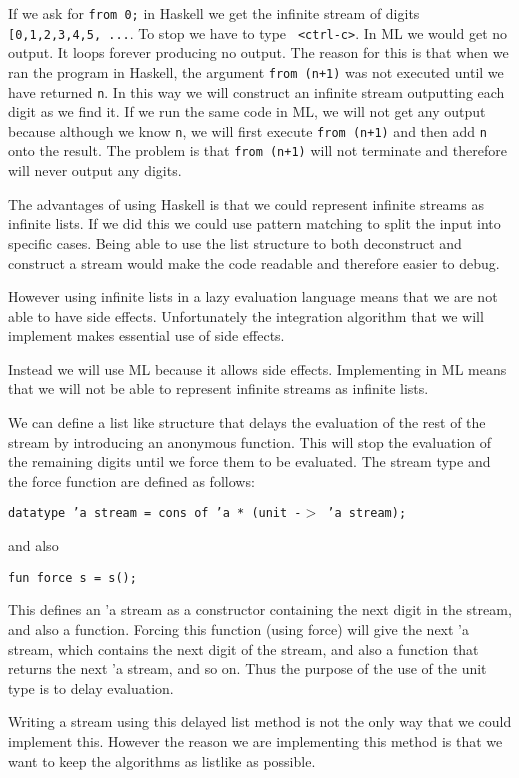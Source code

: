 \documentclass{cs4rep}
\begin{document}
If we ask for {\tt from 0;} in Haskell we get the infinite stream of
digits {\tt [0,1,2,3,4,5, ...}. To stop we have to type {\tt
  <ctrl-c>}. In ML we would get no output. It loops forever producing
no output. The reason for this is that when we ran the program in
Haskell, the argument {\tt from (n+1)} was not executed until we have
returned {\tt n}. In this way we will construct an infinite stream
outputting each digit as we find it. If we run the same code in ML, we
will not get any output because although we know {\tt n}, we will
first execute {\tt from (n+1)} and then add {\tt n} onto the result.
The problem is that {\tt from (n+1)} will not terminate and therefore
will never output any digits.

The advantages of using Haskell is that we could represent infinite
streams as infinite lists.  If we did this we could use pattern
matching to split the input into specific cases. Being able to use
the list structure to both deconstruct and construct a stream would
make the code readable and therefore easier to debug.

However using infinite lists in a lazy evaluation language means that
we are not able to have side effects. Unfortunately the integration
algorithm that we will implement makes essential use of side effects.

Instead we will use ML because it allows side effects.
Implementing in ML means that we will not be able to represent
infinite streams as infinite lists.

We can define a list like structure that delays the evaluation of the
rest of the stream by introducing an anonymous function. This will
stop the evaluation of the remaining digits until we force them to be
evaluated. The stream type and the force function are defined as follows:

{\tt datatype 'a stream = cons of 'a * (unit -$>$ 'a stream);}
 
and also

{\tt fun force s = s();}
 
This defines an 'a stream as a constructor containing the next digit
in the stream, and also a function. Forcing this function (using
force) will give the next 'a stream, which contains the next digit of
the stream, and also a function that returns the next 'a stream, and
so on. Thus the purpose of the use of the unit type is to delay
evaluation.
 
Writing a stream using this delayed list method is not the only way
that we could implement this. However the reason we are implementing
this method is that we want to keep the algorithms as listlike as
possible.
\end{document}
